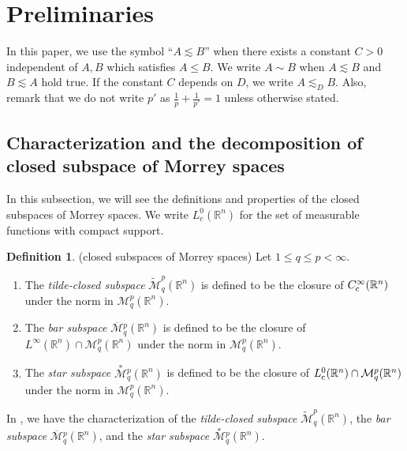 \documentclass[11pt,a4]{article}
\numberwithin{equation}{section}
\theoremstyle{definition}
\newtheorem{definition}[theorem]{Definition}
\theoremstyle{remark}
\begin{document}
\section{Preliminaries}
In this paper, we use the symbol ``$A \lesssim B$'' when there exists a constant $C > 0$ independent of $A,B$ which satisfies $A \le B$. We write $A \sim B$ when $A \lesssim B$ and $B \lesssim A$ hold true. If the constant $C$ depends on $D$, we write $A \lesssim_D B$. Also, remark that we do not write $p'$ as $\frac{1}{p}+\frac{1}{p'}=1$ unless otherwise stated.




\subsection{Characterization and the decomposition of closed subspace of Morrey spaces} 
In this subsection, we will see the definitions and properties of the closed subspaces of Morrey spaces.
We write $L^0_c({\mathbb{R}}^n)$ for the set of measurable functions with compact support. 

\begin{definition}{(closed subspaces of Morrey spaces)}
Let $1 \le q \le p < \infty$.
	\begin{enumerate}
			\item[$(1)$]
				The {\it tilde-closed subspace}
				$\widetilde{\mathcal M}^{p}_q({\mathbb R}^n)$
				is defined to be the closure
				of $C^\infty_{\rm c}({\mathbb R}^n)$
				under the norm in ${\mathcal M}^{p}_q({\mathbb R}^n)$.

			\item[$(2)$]
				The {\it bar subspace}
				$\overline{\mathcal M}{}^p_q({\mathbb R}^n)$
				is defined to be the closure of
				$L^{\infty}({\mathbb R}^n) \cap {\mathcal M}^p_q({\mathbb R}^n)$
				under the norm in
				${\mathcal M}^p_q({\mathbb R}^n)$.

			\item[$(3)$]
				The {\it star subspace} $\overset{*}{\mathcal M}{}^p_q({\mathbb R}^n)$  is defined to be the closure of $L^0_{\rm c}({\mathbb R}^n) \cap {\mathcal M}^p_q({\mathbb R}^n)$ under the norm in ${\mathcal M}^p_q({\mathbb R}^n)$.
		\end{enumerate}
\end{definition}

In \cite{MS1}, we have the characterization of the {\it tilde-closed subspace} $\widetilde{\mathcal M}^{p}_q({\mathbb R}^n)$, the {\it bar subspace} $\overline{\mathcal M}{}^p_q({\mathbb R}^n)$, and the {\it star subspace} $\overset{*}{\mathcal M}{}^p_q({\mathbb R}^n)$.
\end{document}

